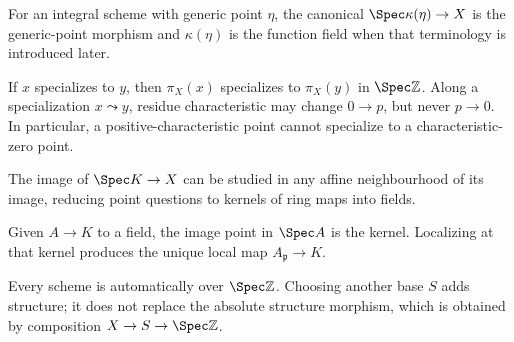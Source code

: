 \begin{example}\label{ex:vi21-ae10}
For an integral scheme with generic point $\eta$, the canonical $\Spec\kappa(\eta)\to X$ is the generic-point morphism and $\kappa(\eta)$ is the function field when that terminology is introduced later.
\end{example}
\begin{example}\label{ex:vi21-ae11}
If $x$ specializes to $y$, then $\pi_X(x)$ specializes to $\pi_X(y)$ in $\Spec\mathbb Z$.  Along a specialization $x\leadsto y$, residue characteristic may change $0\to p$, but never $p\to0$.  In particular, a positive-characteristic point cannot specialize to a characteristic-zero point.
\end{example}
\begin{example}\label{ex:vi21-ae12}
The image of $\Spec K\to X$ can be studied in any affine neighbourhood of its image, reducing point questions to kernels of ring maps into fields.
\end{example}
\begin{example}\label{ex:vi21-ae13}
Given $A\to K$ to a field, the image point in $\Spec A$ is the kernel.  Localizing at that kernel produces the unique local map $A_{\mathfrak p}\to K$.
\end{example}
\begin{example}\label{ex:vi21-ae14}
Every scheme is automatically over $\Spec\mathbb Z$.  Choosing another base $S$ adds structure; it does not replace the absolute structure morphism, which is obtained by composition $X\to S\to\Spec\mathbb Z$.
\end{example}

